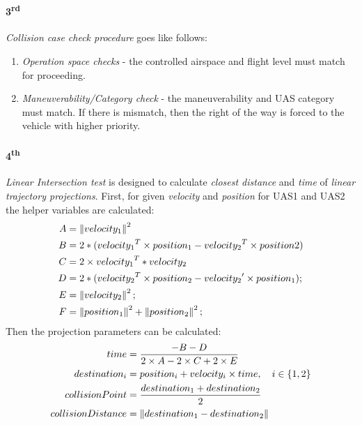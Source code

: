 \paragraph{3\textsuperscript{rd}} \emph{Collision case check procedure} goes like follows:
\begin{enumerate}
    \item \emph{Operation space checks} - the controlled airspace and flight level must match for proceeding.
    
    \item \emph{Maneuverability/Category check} - the maneuverability and UAS category must match. If there is mismatch, then the right of the way is forced to the vehicle with higher priority.
\end{enumerate}

\paragraph{4\textsuperscript{th}} \emph{Linear Intersection test} is designed to calculate \emph{closest distance} and \emph{time} of \emph{linear trajectory projections}.  First, for given \emph{velocity} and \emph{position} for UAS1 and UAS2 the helper variables are calculated:
\begin{equation}
    \begin{aligned}
        A&=\left\lVert velocity_1\right\rVert^2\\
        B&=2*({velocity_1}^T\times position_1-{velocity_2}^T\times position2)\\
        C&=2\times {velocity_1}^T *velocity_2\\
        D&=2*({velocity_2}^T \times position_2 - {velocity_2}' \times {position_1});\\
        E&=\left\lVert velocity_2\right\rVert^2;\\
        F&=\left\lVert position_1\right\rVert^2 + \left\lVert position_2\right\rVert^2;\\
    \end{aligned}\\
\end{equation}
\noindent Then the projection parameters can be calculated:
\begin{equation}
    \begin{aligned}
    time& = \frac{-B-D}{2 \times A- 2 \times C+ 2 \times E}\\
    destination_i &= position_i + velocity_i \times time, \quad i \in \{1,2\}\\
    collisionPoint &= \frac{destination_1 + destination_2}{2}\\
    collisionDistance &= \left\lVert destination_1 - destination_2\right\rVert\\
    \end{aligned}
\end{equation}

